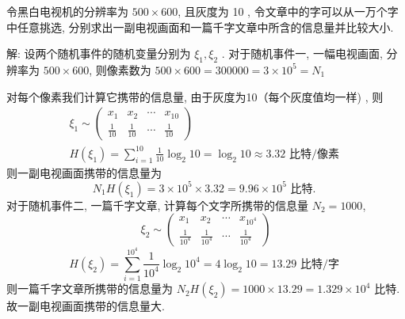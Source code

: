 \begin{example}
令黑白电视机的分辨率为 $ 500 \times 600 $, 且灰度为 10 , 令文章中的字可以从一万个字中任意挑选, 分别求出一副电视画面和一篇千字文章中所含的信息量并比较大小.

解: 设两个随机事件的随机变量分别为 $ \xi_{1}, \xi_{2} $ .
对于随机事件一, 一幅电视画面, 分辨率为 $ 500 \times 600 $, 则像素数为 $ 500 \times 600=300000=3 \times 10^{5}=N_{1} $

对每个像素我们计算它携带的信息量, 由于灰度为10（每个灰度值均一样) , 则
$$
\begin{array}{l}
\xi_{1} \sim\left(\begin{array}{cccc}
x_{1} & x_{2} & \cdots & x_{10} \\
\frac{1}{10} & \frac{1}{10} & \cdots & \frac{1}{10}
\end{array}\right) \\
H\left(\xi_{1}\right)=\sum\limits_{i=1}^{10} \frac{1}{10} \log _{2} 10=\log _{2} 10 \approx 3.32 \text { 比特/像素 }
\end{array}
$$
则一副电视画面携带的信息量为
$$
N_{1} H\left(\xi_{1}\right)=3 \times 10^{5} \times 3.32=9.96 \times 10^{5} \text { 比特. }
$$
对于随机事件二, 一篇千字文章, 计算每个文字所携带的信息量 $ N_{2}=1000 $,
$$
\xi_{2} \sim\left(\begin{array}{cccc}
x_{1} & x_{2} & \cdots & x_{10^{4}} \\
\frac{1}{10^{4}} & \frac{1}{10^{4}} & \cdots & \frac{1}{10^{4}}
\end{array}\right)
$$
$$
H\left(\xi_{2}\right)=\sum_{i=1}^{10^{4}} \frac{1}{10^{4}} \log _{2} 10^{4}=4 \log _{2} 10=13.29 \text { 比特/字 }
$$
则一篇千字文章所携带的信息量为
$ N_{2} H\left(\xi_{2}\right)=1000 \times 13.29=1.329 \times 10^{4} $ 比特.
故一副电视画面携带的信息量大.

\end{example}







